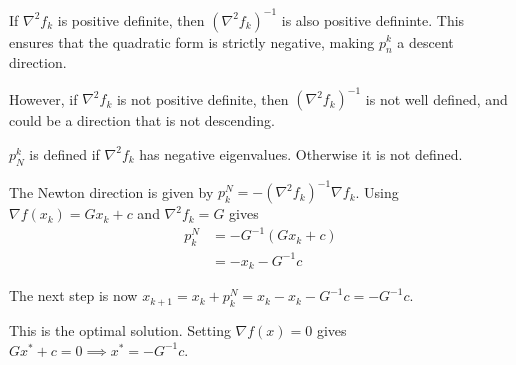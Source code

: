 If $\nabla ^2f_k$ is positive definite, then $(\nabla ^2f_k)^{-1}$ is also positive defininte. This ensures that the quadratic form is strictly negative, making $p_n^{k}$ a descent direction.

\medskip However, if $\nabla ^2 f_k$ is not positive definite, then $(\nabla ^2 f_k)^{-1}$ is not well defined, and could be a direction that is not descending.


\medskip $p_N^{k}$ is defined if $\nabla ^2 f_k$ has negative eigenvalues. Otherwise it is not defined.


The Newton direction is given by $p_k^{N} = -(\nabla ^2 f_k)^{-1}\nabla f_k$. Using $\nabla f(x_k) = Gx_k + c$ and $\nabla ^2 f_k = G$ gives
\begin{align*}
  p_k^{N} & = -G^{-1}(Gx_k + c) \\
          & = -x_k - G^{-1}c
\end{align*}

The next step is now $x_{k+1} = x_k + p_k^{N} = x_k - x_k - G^{-1}c = -G^{-1}c$.

This is the optimal solution. Setting $\nabla f(x) = 0$ gives $Gx^* + c = 0 \implies x^* = -G^{-1}c$. 